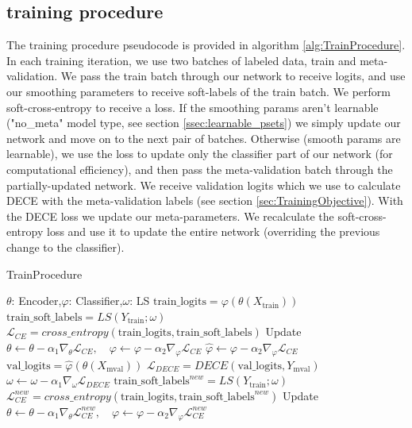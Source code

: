\documentclass[12pt,a4paper]{article}
\begin{document}
\subsection{training procedure}
\label{ssec:traing-procedure}
The training procedure pseudocode is provided in algorithm \ref{alg:TrainProcedure}. In each training iteration, we use two batches of labeled data, train and meta-validation. We pass the train batch through our network to receive logits, and use our smoothing parameters to receive soft-labels of the train batch. We perform soft-cross-entropy to receive a loss. If the smoothing params aren't learnable ("no\_meta" model type, see section \ref{ssec:learnable_psets}) we simply update our network and move on to the next pair of batches. Otherwise (smooth params are learnable), we use the loss to update only the classifier part of our network (for computational efficiency), and then pass the meta-validation batch through the partially-updated network. We receive validation logits which we use to calculate DECE with the meta-validation labels (see section \ref{sec:TrainingObjective}). With the DECE loss we update our meta-parameters. We recalculate the soft-cross-entropy loss and use it to update the entire network (overriding the previous change to the classifier).
\begin{algorithm*}
	\caption{TrainProcedure}
	\label{alg:TrainProcedure}
	\begin{algorithmic}[1]
		\State $\theta$: Encoder,\quad $\varphi$: Classifier,\quad $\omega$: LS
		\State $\text{train\_logits}=\varphi(\theta(X_{\text{train}}))$
		\State $\text{train\_soft\_labels}=LS(Y_{\text{train}};\omega)$
		\State $\mathcal{L}_{CE}=cross\_entropy(\text{train\_logits}, \text{train\_soft\_labels})$
		\State Update $\theta \leftarrow \theta - \alpha_1 \nabla_{\theta}\mathcal{L}_{CE},\quad \varphi \leftarrow \varphi - \alpha_2 \nabla_{\varphi}\mathcal{L}_{CE}$
		\Else
		\State $\hat{\varphi} \leftarrow \varphi - \alpha_2 \nabla_{\varphi}\mathcal{L}_{CE}$
		\State $\text{val\_logits}=\hat{\varphi}(\theta(X_{\text{mval}}))$
		\State $\mathcal{L}_{DECE}=DECE(\text{val\_logits}, Y_{\text{mval}})$
		\State $\omega \leftarrow \omega - \alpha_1 \nabla_{\omega}\mathcal{L}_{DECE}$
		\State $\text{train\_soft\_labels}^{new}=LS(Y_{\text{train}};\omega)$
		\State $\mathcal{L}_{CE}^{new}=cross\_entropy(\text{train\_logits}, \text{train\_soft\_labels}^{new})$
		\State Update $\theta \leftarrow \theta - \alpha_1 \nabla_{\theta}\mathcal{L}_{CE}^{new},\quad \varphi \leftarrow \varphi - \alpha_2 \nabla_{\varphi}\mathcal{L}_{CE}^{new}$
		\EndIf
		\EndFor
	\end{algorithmic} 
\end{algorithm*}
\end{document}
